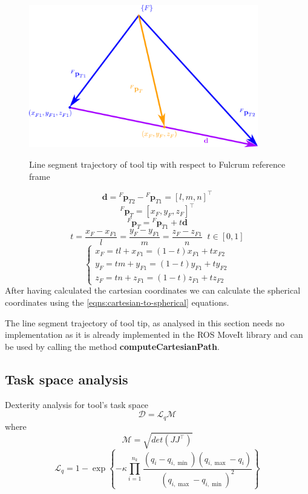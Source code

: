 \begin{center}
\begin{figure}[H]
\centering
\includegraphics[width=10cm]{images/line-segment-trajectory-wrt-fulcrum.png}\\
\caption{Line segment trajectory of tool tip with respect to Fulcrum reference frame}
\end{figure}
\end{center}
\[
\mathbf{d} = {}^{F}\mathbf{p}^{}_{T2} - {}^{F}\mathbf{p}^{}_{T1} = [l, m, n]^\top
\]
\[
{}^{F}\mathbf{p}^{}_{T} = [x^{}_{F}, y^{}_{F}, z^{}_{F}]^\top
\]
\[
{}^{F}\mathbf{p}^{}_{T} = {}^{F}\mathbf{p}^{}_{T1} + t\mathbf{d}
\]
\[
t = \frac{x^{}_{F} - x^{}_{F1}}{l} = \frac{y^{}_{F} - y^{}_{F1}}{m} = \frac{z^{}_{F} - z^{}_{F1}}{n} \;\; t \in [0, 1]
\]
\[
\begin{cases}
x^{}_{F} = tl + x^{}_{F1} = (1-t)x^{}_{F1} + tx^{}_{F2} \\
y^{}_{F} = tm + y^{}_{F1} = (1-t)y^{}_{F1} + ty^{}_{F2} \\
z^{}_{F} = tn + z^{}_{F1} = (1-t)z^{}_{F1} + tz^{}_{F2}
\end{cases}
\]
After having calculated the cartesian coordinates we can calculate the spherical coordinates using the \ref{eqns:cartesian-to-spherical} equations.

The line segment trajectory of tool tip, as analysed in this section needs no implementation as 
it is already implemented in the ROS MoveIt library and can be used by calling the method 
\textbf{computeCartesianPath}.

\subsection{Task space analysis}

Dexterity analysis for tool's task space
\begin{equation}
\mathcal{D} = \mathcal{L}_q \mathcal{M}
\end{equation}
where
\begin{equation}
\mathcal{M} = \sqrt{det(J J^\top)}
\end{equation}
\begin{equation}
\mathcal{L}_{q}=1-\exp\left\{-\kappa\prod_{i=1}^{n_{k}}\frac{(q_{ {i}}-q_{i,\min})(q_{i,\max}-q_{i})}{(q_{i,\max}-q_{i,\min})^{2}}\right\}
\end{equation}

